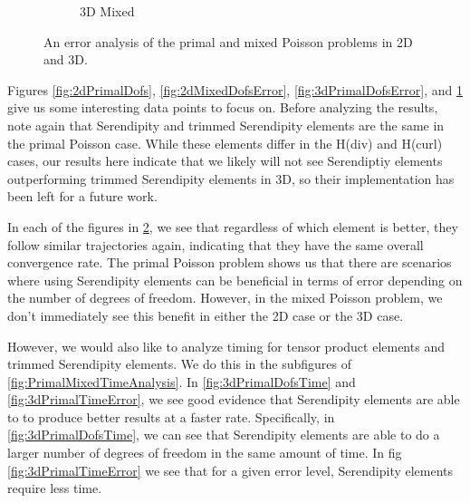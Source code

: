 \documentclass[manuscript,screen]{acmart}
\begin{document}
\begin{figure}[h!]
\begin{subfigure}[h]{0.5\textwidth}
    \caption{3D Mixed}
    \label{fig:3dMixedDofsError}
  \end{subfigure}
  \caption{An error analysis of the primal and mixed Poisson problems in 2D and 3D.}
\label{fig:PrimalMixedErrorAnalysis}
\end{figure}


Figures \ref{fig:2dPrimalDofs}, \ref{fig:2dMixedDofsError}, \ref{fig:3dPrimalDofsError}, and \ref{fig:3dMixedDofsError} give us some interesting data points to focus on.  Before analyzing the results, note again that Serendipity and trimmed Serendipity elements are the same in the primal Poisson case.  While these elements differ in the H(div) and H(curl) cases, our results here indicate that we likely will not see Serendiptiy elements outperforming trimmed Serendipity elements in 3D, so their implementation has been left for a future work.

In each of the figures in \ref{fig:PrimalMixedErrorAnalysis}, we see that regardless of which element is better, they follow similar trajectories again, indicating that they have the same overall convergence rate.  The primal Poisson problem shows us that there are scenarios where using Serendipity elements can be beneficial in terms of error depending on the number of degrees of freedom.  However, in the mixed Poisson problem, we don't immediately see this benefit in either the 2D case or the 3D case.

However, we would also like to analyze timing for tensor product elements and trimmed Serendipity elements.  We do this in the subfigures of \ref{fig:PrimalMixedTimeAnalysis}.  In \ref{fig:3dPrimalDofsTime} and \ref{fig:3dPrimalTimeError}, we see good evidence that Serendipity elements are able to to produce better results at a faster rate.  Specifically, in \ref{fig:3dPrimalDofsTime}, we can see that Serendipity elements are able to do a larger number of degrees of freedom in the same amount of time.  In fig \ref{fig:3dPrimalTimeError} we see that for a given error level, Serendipity elements require less time.
\end{document}
